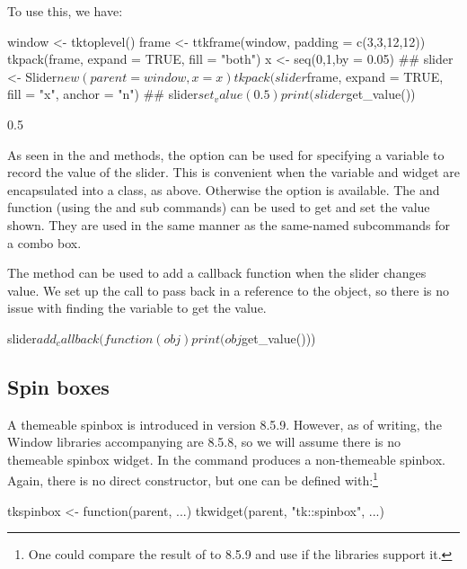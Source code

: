 To use this, we have:
\begin{Schunk}
\begin{Sinput}
 window <- tktoplevel()
 frame <- ttkframe(window, padding = c(3,3,12,12))
 tkpack(frame, expand = TRUE, fill = "both")
 x <- seq(0,1,by = 0.05)
 ##
 slider <- Slider$new(parent = window, x = x)
 tkpack(slider$frame, expand = TRUE, fill = "x", anchor = "n")
 ##
 slider$set_value(0.5)
 print(slider$get_value())
\end{Sinput}
\begin{Soutput}
[1] 0.5
\end{Soutput}
\end{Schunk}

As seen in the  and  methods, the
 option can be used for specifying a \TCL\/
variable to record the value of the slider. This is convenient when
the variable and widget are encapsulated into a class, as
above. Otherwise the  option is available.
The  and  function (using the
 and  sub
commands) can be used to get and set the value shown. They are used in
the same manner as the same-named subcommands for a combo box.

The  method can be used to add a callback function
when the slider changes value. We set up the call to pass back in a
reference to the object, so there is no issue with finding the \TCL\/
variable to get the value.
\begin{Schunk}
\begin{Sinput}
 slider$add_callback(function(obj) print(obj$get_value()))
\end{Sinput}
\end{Schunk}


\subsection{Spin boxes}
\label{sec:tcltk:spinboxes}

A themeable spinbox is introduced in \TK\/ version 8.5.9. However,  as of
writing, the Window libraries accompanying \R{} are 8.5.8, so we will
assume there is no themeable spinbox widget. In \TK\/ the
 command produces a non-themeable spinbox. Again, there
is no direct  constructor, but one can be
defined with:\footnote{One could compare the result of
   to 8.5.9 and use
   if the libraries support it.}
\begin{Schunk}
\begin{Sinput}
 tkspinbox <- function(parent, ...) 
     tkwidget(parent, "tk::spinbox", ...)
\end{Sinput}
\end{Schunk}


